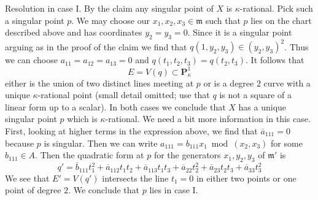 \medskip\noindent
Resolution in case I. By the claim any
singular point of $X$ is $\kappa$-rational. Pick such a singular point $p$.
We may choose our $x_1, x_2, x_3 \in \mathfrak m$ such that $p$
lies on the chart described above and has coordinates $y_2 = y_3 = 0$.
Since it is a singular point arguing as in the proof of the claim
we find that $q(1, y_2, y_3) \in (y_2, y_3)^2$.
Thus we can choose $a_{11} = a_{12} = a_{13} = 0$ and
$q(t_1, t_2, t_3) = q(t_2, t_3)$. It follows that
$$
E = V(q) \subset \mathbf{P}^1_\kappa
$$
either is the union of two distinct lines meeting at $p$
or is a degree $2$ curve with a unique $\kappa$-rational point
(small detail omitted; use that $q$ is not a square of a linear
form up to a scalar).
In both cases we conclude that $X$ has a unique singular point $p$
which is $\kappa$-rational. We need a bit more information in this
case. First, looking at higher terms in the expression above, we
find that $\overline{a}_{111} = 0$ because $p$ is singular.
Then we can write $a_{111} = b_{111} x_1 \bmod (x_2, x_3)$
for some $b_{111} \in A$. Then
the quadratic form at $p$ for the generators
$x_1, y_2, y_3$ of $\mathfrak m'$ is
$$
q' =
\overline{b}_{111} t_1^2 +
\overline{a}_{112} t_1 t_2 + \overline{a}_{113} t_1 t_3 +
\overline{a}_{22} t_2^2 +
\overline{a}_{23} t_2 t_3 +
\overline{a}_{33} t_3^2
$$
We see that $E' = V(q')$ intersects the line $t_1 = 0$ in either
two points or one point of degree $2$. We conclude that $p$
lies in case I.

